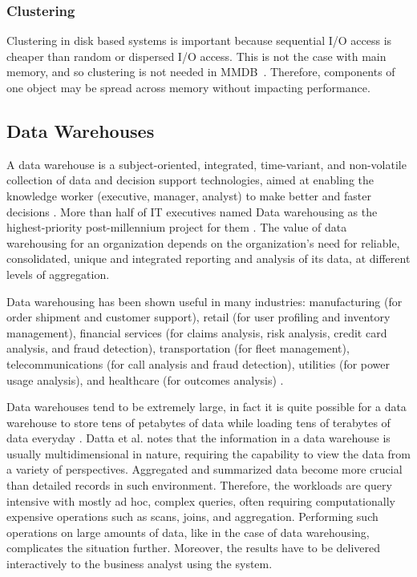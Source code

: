 \documentclass[12pt,a4paper]{article}
\begin{document}
\subsubsection{Clustering}
Clustering in disk based systems is important because sequential I/O access is cheaper than random or dispersed I/O access. This is not the case with main
memory, and so clustering is not needed in MMDB~\cite{garcia1992main, moldovan2008databases}. Therefore, components of one object may be spread across memory
without impacting performance.



\subsection{Data Warehouses}
\label{SEC-WAREHOUSES}
A data warehouse is a subject-oriented, integrated, time-variant, and non-volatile collection of data and decision support technologies, aimed at enabling the knowledge worker (executive, manager, analyst) to make better and faster decisions \cite{560407, 248616}. More than half of IT executives named Data warehousing as the highest-priority post-millennium project for them \cite{sen2005comparison}. The value of data warehousing for an organization depends on the organization's need for reliable, consolidated, unique and integrated reporting and analysis of its data, at different levels of aggregation.

Data warehousing has been shown useful in many industries: manufacturing (for order shipment and customer support), retail (for user profiling and inventory
management), financial services (for claims analysis, risk analysis, credit card analysis, and fraud detection), transportation (for fleet management),
telecommunications (for call analysis and fraud detection), utilities (for power usage analysis), and healthcare (for outcomes analysis) \cite{248616}.

Data warehouses tend to be extremely large, in fact it is quite possible for a data warehouse to store tens of petabytes of data while loading tens of terabytes of data everyday \cite{thusoo2010data}. Datta et al. \cite {628286} notes that the information in a data warehouse is usually multidimensional in nature, requiring the capability to view the data from a variety of perspectives. Aggregated and summarized data become more crucial than detailed records in such environment. Therefore, the workloads are query intensive with mostly ad hoc, complex queries, often requiring computationally expensive operations such as scans, joins, and aggregation. Performing such operations on large amounts of data, like in the case of data warehousing, complicates the situation further. Moreover, the results have to be delivered interactively to the business analyst using the system.
\end{document}

